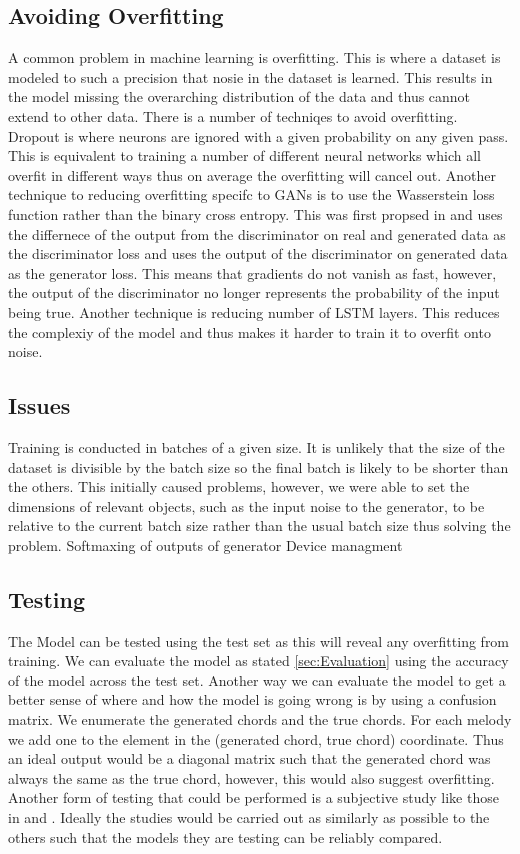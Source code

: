 \subsection{Avoiding Overfitting}
A common problem in machine learning is overfitting. This is where a dataset is modeled to such a precision that nosie in the dataset is learned.
This results in the model missing the overarching distribution of the data and thus cannot extend to other data.
There is a number of techniqes to avoid overfitting.
Dropout is where neurons are ignored with a given probability on any given pass. 
This is equivalent to training a number of different neural networks which all overfit in different ways thus on average the overfitting will cancel out.
Another technique to reducing overfitting specifc to GANs is to use the Wasserstein loss function rather than the binary cross entropy. 
This was first propsed in \cite{Wasserstein} and uses the differnece of the output from the discriminator on real and generated data as the discriminator loss and uses the output of the discriminator on generated data as the generator loss.
This means that gradients do not vanish as fast, however, the output of the discriminator no longer represents the probability of the input being true.
Another technique is reducing number of LSTM layers. 
This reduces the complexiy of the model and thus makes it harder to train it to overfit onto noise.

\subsection{Issues}
Training is conducted in batches of a given size.
It is unlikely that the size of the dataset is divisible by the batch size so the final batch is likely to be shorter than the others.
This initially caused problems, however, we were able to set the dimensions of relevant objects, such as the input noise to the generator, to be relative to the current batch size rather than the usual batch size thus solving the problem.
Softmaxing of outputs of generator
Device managment

\subsection{Testing}
The Model can be tested using the test set as this will reveal any overfitting from training. 
We can evaluate the model as stated \ref{sec:Evaluation} using the accuracy of the model across the test set.
Another way we can evaluate the model to get a better sense of where and how the model is going wrong is by using a confusion matrix.
We enumerate the generated chords and the true chords. 
For each melody we add one to the element in the (generated chord, true chord) coordinate. 
Thus an ideal output would be a diagonal matrix such that the generated chord was always the same as the true chord, however, this would also suggest overfitting.
Another form of testing that could be performed is a subjective study like those in \cite{MySong} and \cite{BLSTM}.
Ideally the studies would be carried out as similarly as possible to the others such that the models they are testing can be reliably compared.

